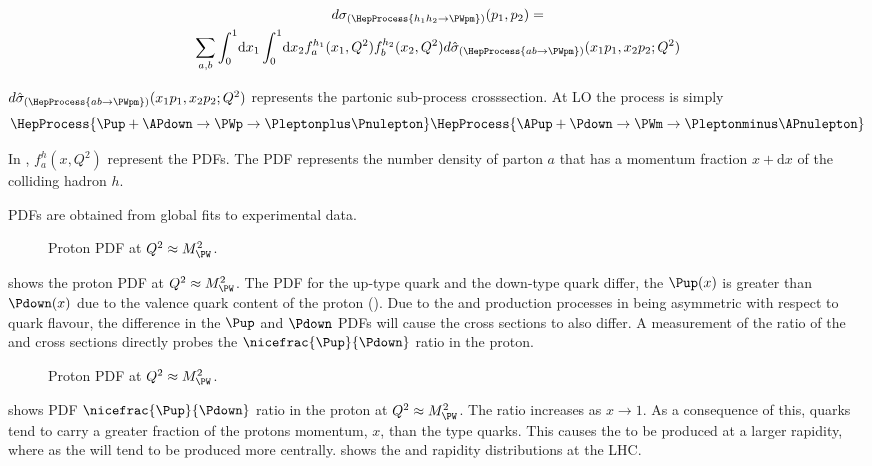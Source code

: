 \begin{multline}
  d\sigma_{(\HepProcess{h_1 h_2 \to \PWpm})}(p_1,p_2) = \\
  \sum\limits_{a,b}
  \int_0^1 \! \mathrm{d} x_1 
  \int_0^1 \! \mathrm{d} x_2 
  f_a^{h_1}(x_1,Q^2)
  f_b^{h_2}(x_2,Q^2) 
  d\hat{\sigma}_{(\HepProcess{a b \to \PWpm})}(x_1 p_1, x_2 p_2; Q^2)
  \label{wbos:xsec}
\end{multline}


$d\hat{\sigma}_{(\HepProcess{a b \to \PWpm})}(x_1 p_1, x_2 p_2; Q^2)$
represents the partonic sub-process crosssection. At \ac{LO} the process is
simply
\begin{equation}
  \HepProcess{\Pup + \APdown \to \PWp \to \Pleptonplus \Pnulepton} \label{wbos:wprod} \\
  \HepProcess{\APup + \Pdown \to \PWm \to \Pleptonminus \APnulepton}
\end{equation}

In , $f_a^{h}(x,Q^2)$ represent the \acp{PDF}.
The \ac{PDF} represents the number density of parton $a$ that has a momentum
fraction $x+\mathrm{d}x$ of the colliding hadron $h$.

\acp{PDF} are obtained from global fits to experimental data. %

\begin{figure}[htb]
  \centering
  \caption{Proton PDF at $Q^2\approx M_{\PW}^2$.}
  \label{wbos:pdf}
\end{figure}

 shows the proton PDF at $Q^2\approx M_{\PW}^2$. 
The \ac{PDF} for the up-type quark and the down-type quark differ, the
$\Pup(x)$ is greater than $\Pdown(x)$ due to the valence quark content of the
proton (\HepProcess{\Pup\Pup\Pdown}). 
Due to the \PWp and \PWm production processes in  being asymmetric with
respect to quark flavour, the difference in the $\Pup$ and $\Pdown$ \acp{PDF}
will cause the \PWpm cross sections to also differ.  
A measurement of the ratio of the \PWp and \PWm cross sections directly probes
the $\nicefrac{\Pup}{\Pdown}$ ratio in the proton.

\begin{figure}[htb]
  \centering
  \caption{Proton PDF at $Q^2\approx M_{\PW}^2$.}
  \label{wbos:pdf}
\end{figure}


 shows PDF $\nicefrac{\Pup}{\Pdown}$ ratio in the proton at
$Q^2\approx M_{\PW}^2$. The ratio increases as $x\to 1$. As a consequence of
this, \Pup quarks tend to carry a greater fraction of the protons momentum,
$x$, than the \Pdown type quarks. This causes the \PWp to be produced at a
larger rapidity, where as the \PWm will tend to be produced more centrally. 
 shows the \PWp and \PWm rapidity distributions at the
LHC. 

